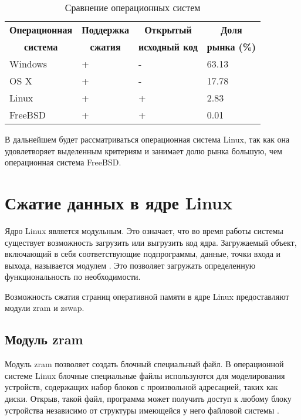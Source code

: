 \begin{table}[h]
    \caption{Сравнение операционных систем}
    \begin{center}
        \begin{tabular}{|l|l|l|l|}
        		\hline
            \multicolumn{1}{|c}{\textbf{Операционная}} & 
            \multicolumn{1}{|c|}{\textbf{Поддержка}} &
            \multicolumn{1}{c|}{\textbf{Открытый}} &
            \multicolumn{1}{c|}{\textbf{Доля}} \\
            \multicolumn{1}{|c}{\textbf{система}} & 
            \multicolumn{1}{|c|}{\textbf{сжатия}} &
            \multicolumn{1}{c|}{\textbf{исходный код}} &
            \multicolumn{1}{c|}{\textbf{рынка (\%)}} \\ \hline
            Windows &  + & - & 63.13 \\ \hline
            OS X & + & - & 17.78 \\ \hline
            Linux & + & + & 2.83 \\ \hline
            FreeBSD & + & + & 0.01 \\ \hline
        \end{tabular}
    \end{center}
    \label{tab:comparison-os}
\end{table}

В дальнейшем будет рассматриваться операционная система Linux, так как она удовлетворяет выделенным критериям и занимает долю рынка большую, чем операционная система FreeBSD.

\section{Сжатие данных в ядре Linux}

Ядро Linux является модульным. Это означает, что во время работы системы существует возможность загрузить или выгрузить код ядра. Загружаемый объект, включающий в себя соответствующие подпрограммы, данные, точки входа и выхода, называется модулем \cite{module}. Это позволяет загружать определенную функциональность по необходимости.

Возможность сжатия страниц оперативной памяти в ядре Linux предоставляют модули zram и zswap.

\subsection{Модуль zram}

Модуль zram позволяет создать блочный специальный файл. В операционной системе Linux блочные специальные файлы используются для моделирования устройств, содержащих набор блоков с произвольной адресацией, таких как диски. Открыв, такой файл, программа может получить доступ к любому блоку устройства независимо от структуры имеющейся
у него файловой системы \cite{block-file}.

